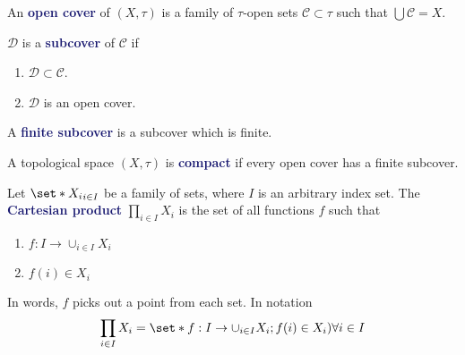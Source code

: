 \documentclass[11pt]{article}
\numberwithin{equation}{section}
\newcommand{\navy}[1]{\textcolor{MidnightBlue}{\bf #1}}
\theoremstyle{definition}
\theoremstyle{definition}
\def\Set{\set*}%
\def\ss{\subset}
\newcommand{\1}{\mathbbm 1}
\def\t{\tau}
\newcommand{\cC}{\mathcal C}
\newcommand{\dD}{\mathcal D}
\begin{document}
\begin{definition}
An \navy{open cover} of $(X,\t)$ is a family of $\t$-open sets $\cC \ss \t$ such that $\bigcup \cC = X$.
\end{definition}

\begin{definition}[Subcover]
$\dD$ is a \navy{subcover} of $\cC$ if
\begin{enumerate}
\item $\dD \ss \cC$.
\item $\dD$ is an open cover.
\end{enumerate}
A \navy{finite subcover} is a subcover which is finite.
\end{definition}

\begin{definition}[Compact]
A topological space $(X,\t)$ is \navy{compact} if every open cover has a finite subcover.
\end{definition}

\begin{definition}
Let $\Set{X_i}_{i\in I}$ be a family of sets, where $I$ is an arbitrary index set. The \navy{Cartesian product} $\prod_{i \in I} X_i$ is the set of all functions $f$ such that
\begin{enumerate}
\item $f: I \to \cup_{i \in I} X_i$
\item $f(i) \in X_i$
\end{enumerate}
In words, $f$ picks out a point from each set. In notation
\begin{equation}
\prod_{i \in I} X_i = \Set{f: I \to \cup_{i \in I} X_i; f(i) \in X_i) \forall i \in I}
\end{equation}
\end{definition}
\end{document}
